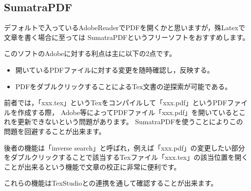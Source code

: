 \documentclass[a4paper,10pt,twocolumn,fleqn]{jarticle}
\begin{document}
\subsection{SumatraPDF}
デフォルトで入っているAdobeReaderでPDFを開くかと思いますが，殊Latexで文章を書く場合に至っては
SumatraPDFというフリーソフトをおすすめします。

このソフトのAdobeに対する利点は主に以下の2点です。
\begin{itemize}
	\item 開いているPDFファイルに対する変更を随時確認し，反映する。
	\item PDFをダブルクリックすることによるTex文書の逆探索が可能である。
\end{itemize}
前者では，「xxx.tex」というTexをコンパイルして「xxx.pdf」というPDFファイルを作成する際，
Adobe等によってPDFファイル「xxx.pdf」を開いているとこれを更新できないという問題があります。
SumatraPDFを使うことによりこの問題を回避することが出来ます。

後者の機能は「inverse search」と呼ばれ，例えば「xxx.pdf」の変更したい部分をダブルクリックすることで該当するTexファイル「xxx.tex」の該当位置を開くことが出来るという機能で文章の校正に非常に便利です。

これらの機能はTexStudioとの連携を通して確認することが出来ます。
\end{document}
